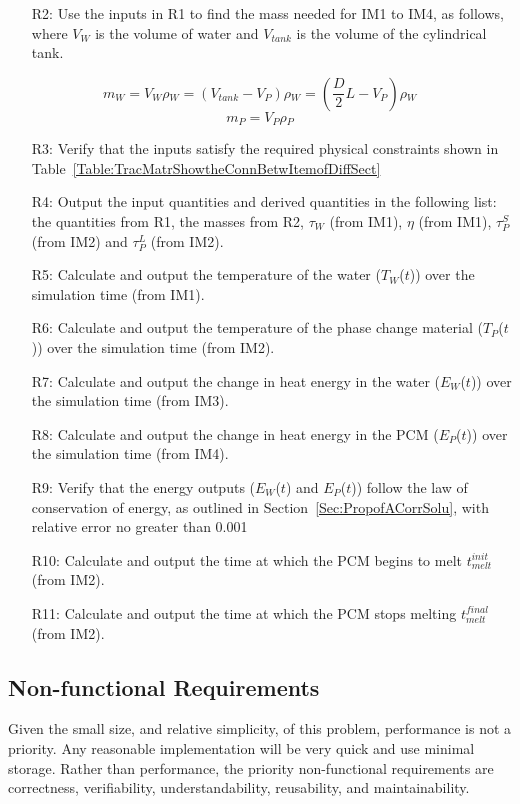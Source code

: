 \documentclass[12pt]{article}
\begin{document}
\begin{itemize}
\item[R2:]Use the inputs in R1 to find the mass needed for IM1 to IM4, as follows, where $V_{W}$ is the volume of water and $V_{tank}$ is the volume of the cylindrical tank.
\end{itemize}
\begin{equation}
m_{W}=V_{W}\rho{}_{W}=(V_{tank}-V_{P})\rho{}_{W}=(\frac{D}{2}L-V_{P})\rho{}_{W}
\end{equation}
\begin{equation}
m_{P}=V_{P}\rho{}_{P}
\end{equation}
\begin{itemize}
\item[R3:]Verify that the inputs satisfy the required physical constraints shown in Table~\ref{Table:TracMatrShowtheConnBetwItemofDiffSect}
\item[R4:]Output the input quantities and derived quantities in the following list: the quantities from R1, the masses from R2, $\tau{}_{W}$ (from IM1), $\eta{}$ (from IM1), $\tau{}_{P}^{S}$ (from IM2) and $\tau{}_{P}^{L}$ (from IM2).
\item[R5:]Calculate and output the temperature of the water ($T_{W}$($t$)) over the simulation time (from IM1).
\item[R6:]Calculate and output the temperature of the phase change material ($T_{P}$($t$)) over the simulation time (from IM2).
\item[R7:]Calculate and output the change in heat energy in the water ($E_{W}$($t$)) over the simulation time (from IM3).
\item[R8:]Calculate and output the change in heat energy in the PCM ($E_{P}$($t$)) over the simulation time (from IM4).
\item[R9:]Verify that the energy outputs ($E_{W}$($t$) and $E_{P}$($t$)) follow the law of conservation of energy, as outlined in Section~\ref{Sec:PropofACorrSolu}, with relative error no greater than 0.001%
\item[R10:]Calculate and output the time at which the PCM begins to melt $t_{melt}^{init}$ (from IM2).
\item[R11:]Calculate and output the time at which the PCM stops melting $t_{melt}^{final}$ (from IM2).
\end{itemize}
\subsection{Non-functional Requirements}
\label{Sec:Non-Requ}
Given the small size, and relative simplicity, of this problem, performance is not a priority. Any reasonable implementation will be very quick and use minimal storage. Rather than performance, the priority non-functional requirements are correctness, verifiability, understandability, reusability, and maintainability.
\end{document}
